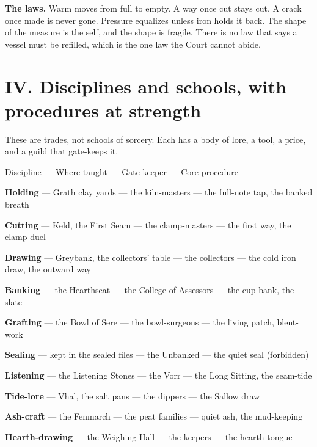 \documentclass{design/chronicle}
\begin{document}
\textbf{The laws.} Warm moves from full to empty. A way once cut stays cut. A crack once made is never gone. Pressure equalizes unless iron holds it back. The shape of the measure is the self, and the shape is fragile. There is no law that says a vessel must be refilled, which is the one law the Court cannot abide.

\section*{IV. Disciplines and schools, with procedures at strength}

These are trades, not schools of sorcery. Each has a body of lore, a tool, a price, and a guild that gate-keeps it.

Discipline — Where taught — Gate-keeper — Core procedure\par

\textbf{Holding} — Grath clay yards — the kiln-masters — the full-note tap, the banked breath\par

\textbf{Cutting} — Keld, the First Seam — the clamp-masters — the first way, the clamp-duel\par

\textbf{Drawing} — Greybank, the collectors’ table — the collectors — the cold iron draw, the outward way\par

\textbf{Banking} — the Hearthseat — the College of Assessors — the cup-bank, the slate\par

\textbf{Grafting} — the Bowl of Sere — the bowl-surgeons — the living patch, blent-work\par

\textbf{Sealing} — kept in the sealed files — the Unbanked — the quiet seal (forbidden)\par

\textbf{Listening} — the Listening Stones — the Vorr — the Long Sitting, the seam-tide\par

\textbf{Tide-lore} — Vhal, the salt pans — the dippers — the Sallow draw\par

\textbf{Ash-craft} — the Fenmarch — the peat families — quiet ash, the mud-keeping\par

\textbf{Hearth-drawing} — the Weighing Hall — the keepers — the hearth-tongue\par
\end{document}
